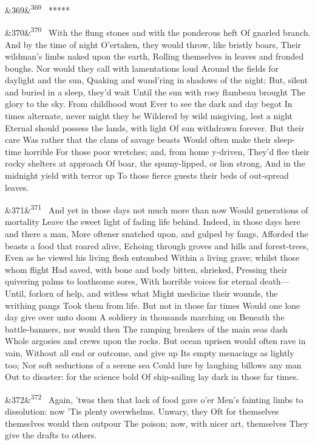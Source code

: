 \documentclass[12pt]{article}
\newcommand{\para}[1][]{\par\noindent\ifx&#1&\else\textsuperscript{\footnotesize #1}~\fi}
\begin{document}
\para[369] *****

\para[370] With the flung stones and with the ponderous heft Of gnarled branch. And by the time of night O'ertaken, they would throw, like bristly boars, Their wildman's limbs naked upon the earth, Rolling themselves in leaves and fronded boughs. Nor would they call with lamentations loud Around the fields for daylight and the sun, Quaking and wand'ring in shadows of the night; But, silent and buried in a sleep, they'd wait Until the sun with rosy flambeau brought The glory to the sky. From childhood wont Ever to see the dark and day begot In times alternate, never might they be Wildered by wild misgiving, lest a night Eternal should possess the lands, with light Of sun withdrawn forever. But their care Was rather that the clans of savage beasts Would often make their sleep-time horrible For those poor wretches; and, from home y-driven, They'd flee their rocky shelters at approach Of boar, the spumy-lipped, or lion strong, And in the midnight yield with terror up To those fierce guests their beds of out-spread leaves.

\para[371] And yet in those days not much more than now Would generations of mortality Leave the sweet light of fading life behind. Indeed, in those days here and there a man, More oftener snatched upon, and gulped by fangs, Afforded the beasts a food that roared alive, Echoing through groves and hills and forest-trees, Even as he viewed his living flesh entombed Within a living grave; whilst those whom flight Had saved, with bone and body bitten, shrieked, Pressing their quivering palms to loathsome sores, With horrible voices for eternal death--- Until, forlorn of help, and witless what Might medicine their wounds, the writhing pangs Took them from life. But not in those far times Would one lone day give over unto doom A soldiery in thousands marching on Beneath the battle-banners, nor would then The ramping breakers of the main seas dash Whole argosies and crews upon the rocks. But ocean uprisen would often rave in vain, Without all end or outcome, and give up Its empty menacings as lightly too; Nor soft seductions of a serene sea Could lure by laughing billows any man Out to disaster: for the science bold Of ship-sailing lay dark in those far times.

\para[372] Again, 'twas then that lack of food gave o'er Men's fainting limbs to dissolution: now 'Tis plenty overwhelms. Unwary, they Oft for themselves themselves would then outpour The poison; now, with nicer art, themselves They give the drafts to others.
\end{document}
